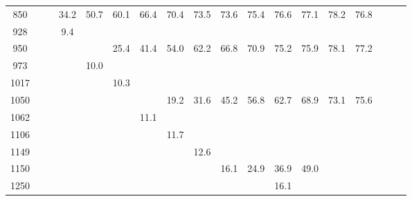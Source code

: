 \begin{table}[ht]
\begin{tabular}{c|ccccccccccccccccc}
    850  &         &        &  34.2    &   50.7   &   60.1   &   66.4   &   70.4    &   73.5    &    73.6  &   75.4  &   76.6 & 77.1 & 78.2 &  76.8 \\
    928  &         &        &   9.4    &          &          &          &           &           &          &         &        &      &      &       \\
    950  &         &        &          &          &   25.4   &   41.4   &   54.0    &   62.2    &    66.8  &   70.9  &   75.2 & 75.9 & 78.1 &  77.2 \\
    973  &         &        &          &   10.0   &          &          &           &           &          &         &        &      &      &       \\
    1017 &         &        &          &          &   10.3   &          &           &           &          &         &        &      &      &       \\
    1050 &         &        &          &          &          &          &   19.2    &   31.6    &    45.2  &   56.8  &   62.7 & 68.9 & 73.1 &  75.6 \\
    1062 &         &        &          &          &          &   11.1   &           &           &          &         &        &      &      &       \\
    1106 &         &        &          &          &          &          &   11.7    &           &          &         &        &      &      &       \\
    1149 &         &        &          &          &          &          &           &   12.6    &          &         &        &      &      &       \\
    1150 &         &        &          &          &          &          &           &           &    16.1  &   24.9  &   36.9 & 49.0 &      &       \\
    1250 &         &        &          &          &          &          &           &           &          &         &   16.1 &      &      &       \\
    \hline
         \hline
  \end{tabular}
  \label{tab:signal_filter_eff}
\end{table}


